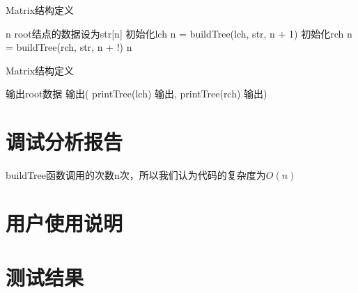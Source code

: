 \begin{algorithm}[htb] 
   \caption{ Matrix结构定义 } 
   \label{alg:Framwork} 
   \begin{algorithmic}[1]
      
         \State \Return n
      \Else
         \State root结点的数据设为str[n]
         \State 初始化lch
         \State n = buildTree(lch, str, n + 1)
         \State 初始化rch
         \State n = buildTree(rch, str, n + !)
         \State \Return n
      \EndIf
   \EndFunction

   \end{algorithmic} 
\end{algorithm}

\begin{algorithm}[htb] 
   \caption{ Matrix结构定义 } 
   \label{alg:Framwork} 
   \begin{algorithmic}[1]
            \State \Return
         \Else
            \State 输出root数据
               \State 输出(
                  \State printTree(lch)
                  \State 输出,
                  \State printTree(rch)
               \State 输出)
            \EndIf
         \EndIf
      \EndFunction
   \end{algorithmic} 
\end{algorithm}


\section{调试分析报告}
   buildTree函数调用的次数n次，所以我们认为代码的复杂度为$O(n)$

\section{用户使用说明}

\section{测试结果}